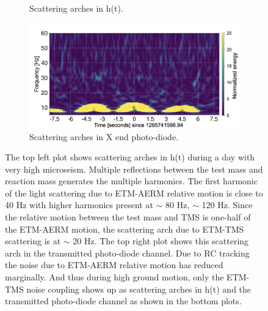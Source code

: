 \documentclass[12pt]{iopart}
\begin{document}
\begin{figure}[h]
\begin{subfigure}[b]{0.45\textwidth}
         \caption{Scattering arches in h(t).}
         \label{fig:1265darm}
    \end{subfigure}
    \begin{subfigure}[b]{0.45\textwidth}
        \centering
         \includegraphics[width =\textwidth]{post_r0_transomeg2.png}
         \caption{Scattering arches in X end photo-diode.}
         \label{fig:1265trans}
     \end{subfigure}
     
     
    \caption{The top left plot shows scattering arches in h(t) during a day with very high microseism. Multiple reflections between the test mass and reaction mass generates the multiple harmonics. The first harmonic of the light scattering due to ETM-AERM relative motion is close to 40 Hz with higher harmonics present at $\sim$ 80 Hz, $\sim$ 120 Hz. Since the relative motion between the test mass and TMS is one-half of the ETM-AERM motion, the scattering arch due to ETM-TMS scattering is at $\sim$ 20 Hz. The top right plot shows this scattering arch in the transmitted photo-diode channel. Due to RC tracking the noise due to ETM-AERM relative motion has reduced marginally. And thus during high ground motion, only the ETM-TMS noise coupling shows up as scattering arches in h(t) and the transmitted photo-diode channel as shown in the bottom plots.}
    \label{fig:1262scat}
    
\end{figure}
\end{document}

